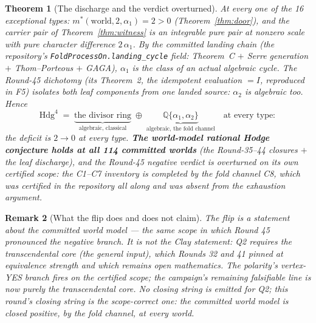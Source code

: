 \documentclass[11pt]{article}
\newtheorem{theorem}{Theorem}
\newtheorem{remark}[theorem]{Remark}
\begin{document}
\begin{theorem}[The discharge and the verdict overturned]\label{thm:discharge}
At every one of the 16 exceptional types: $m^*(\text{world}, 2, \alpha_1) = 2 > 0$
(Theorem~\ref{thm:door}), and the carrier pair of Theorem~\ref{thm:witness} is an integrable
pure pair at nonzero scale with pure character difference $2\,\alpha_1$.  By the committed
landing chain (the repository's \texttt{FoldProcessOn.landing\_cycle} field: Theorem~C $+$
Serre generation $+$ Thom--Porteous $+$ GAGA), $\alpha_1$ is the class of an actual algebraic
cycle.  The Round-45 dichotomy (its Theorem~2, the idempotent evaluation $= I$, reproduced in
F5) isolates both leaf components from one landed source: $\alpha_2$ is algebraic too.  Hence
\[
\mathrm{Hdg}^4 \;=\; \underbrace{\text{the divisor ring}}_{\text{algebraic, classical}}
\;\oplus\; \underbrace{\mathbb{Q}\{\alpha_1, \alpha_2\}}_{\text{algebraic, the fold channel}}
\quad \text{at every type}:
\]
the deficit is $2 \to 0$ at every type.  \textbf{The world-model rational Hodge conjecture
holds at all 114 committed worlds} (the Round-35--44 closures $+$ the leaf discharge), and the
Round-45 negative verdict is \emph{overturned on its own certified scope}: the C1--C7 inventory
is completed by the fold channel C8, which was certified in the repository all along and was
absent from the exhaustion argument.
\end{theorem}

\begin{remark}[What the flip does and does not claim]
The flip is a statement about the \emph{committed world model} --- the same scope in which
Round 45 pronounced the negative branch.  It is not the Clay statement: Q2 requires the
transcendental core (the general input), which Rounds 32 and 41 pinned at equivalence strength
and which remains open mathematics.  The polarity's vertex-YES branch fires \emph{on the
certified scope}; the campaign's remaining falsifiable line is now purely the transcendental
core.  No closing string is emitted for Q2; this round's closing string is the scope-correct
one: \emph{the committed world model is closed positive, by the fold channel, at every world.}
\end{remark}
\end{document}

